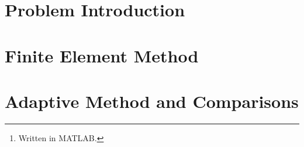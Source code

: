 \documentclass[12pt]{article}
\title{\reporttitle}
\author{Andrea Di Antonio, 858798 \\ \hyperlink{mailto:a.diantonio1@campus.unimib.it}{a.diantonio1@campus.unimib.it}}
\date{Exam session of July 27, 2023 \\ Academic Year 2022-23}
\newcommand{\reporttitle}{Adaptive 1D 1st-order Lagrange FEM}
\begin{document}
	\maketitle
	\thispagestyle{fancy}

	\begin{abstract}
		\begin{center}
            Report for the course \textit{Metodi Numerici per Equazioni alle Derivate Parziali} on the definition and costruction of an \textit{\reporttitle}\footnote{Written in MATLAB.} and a subsequent analysis which includes a comparison against a more naive approach by uniformly refined meshes.
        \end{center}
	\end{abstract}

    \tableofcontents

    \newpage
    \section{Problem Introduction}
    

    \newpage
    \section{Finite Element Method}
    

    \newpage
    \section{Adaptive Method and Comparisons}
\end{document}
